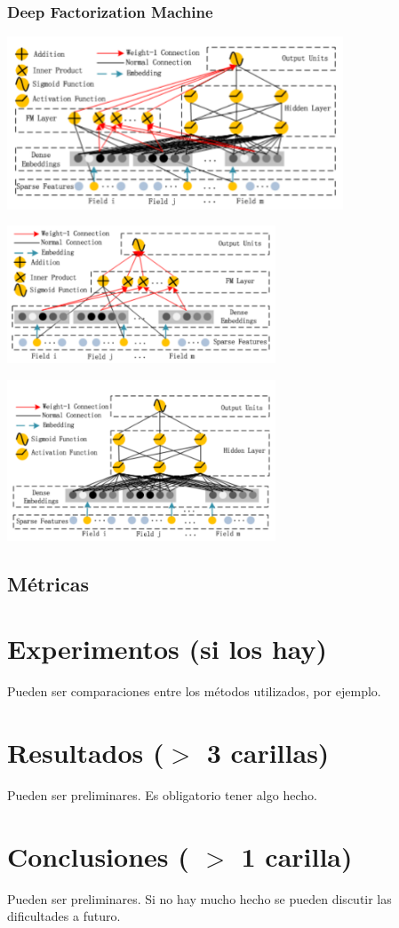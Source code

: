 \documentclass[11pt,a4paper,twoside]{thesis}
\begin{document}
\subsection{Deep Factorization Machine}


\begin{center}
	\includegraphics[width=10cm]{./images/DeepFM.png}
\end{center}


\begin{center}
	\includegraphics[width=8cm]{./images/DFM-FM-Component.png}
\end{center}

\begin{center}
	\includegraphics[width=8cm]{./images/DFM-Deep-Component.png}
\end{center}


\section{Métricas}

\chapter{Experimentos (si los hay)}
Pueden ser comparaciones entre los métodos utilizados, por ejemplo. 

\chapter{Resultados ($>$ 3 carillas)}

Pueden ser preliminares. Es obligatorio tener algo hecho.


\chapter{Conclusiones ( $>$ 1 carilla)} 

Pueden ser preliminares. 
Si no hay mucho hecho se pueden discutir las dificultades a futuro.


\backmatter
%
\end{document}
